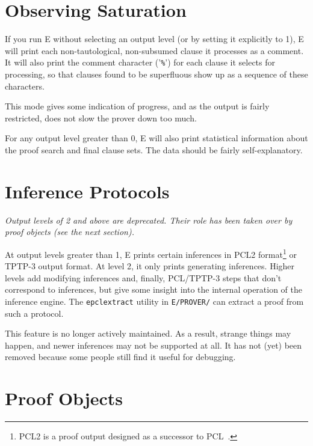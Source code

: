 \documentclass{report}
\begin{document}
\section{Observing Saturation}
\label{sec:output:normal}

If you run E without selecting an output level (or by setting it
explicitly to 1), E will print each non-tautological, non-subsumed
clause it processes as a comment. It will also print the comment
character ('\verb+%+') for each clause it selects for
processing, so that clauses found to be superfluous show up as a
sequence of these characters.

This mode gives some indication of progress, and as the output is
fairly restricted, does not slow the prover down too much.

For any output level greater than 0, E will also print statistical
information about the proof search and final clause sets. The data
should be fairly self-explanatory.


\section{Inference Protocols}
\label{sec:output:lots}

\emph{Output levels of 2 and above are deprecated. Their role has
  been taken over by proof objects (see the next section).}

At output levels greater than 1, E prints certain inferences in
PCL2 format\footnote{PCL2 is a proof output designed as a
  successor to PCL~\cite{DS94a,DS94b,DS96a}.} or TPTP-3 output
format. At level 2, it only prints generating
inferences. Higher levels add modifying inferences and, finally,
PCL/TPTP-3 steps that don't correspond to inferences, but give some
insight into the internal operation of the inference engine. The
\texttt{epclextract} utility in \texttt{E/PROVER/} can extract a
proof from such a protocol.

This feature is no longer actively maintained. As a result, strange
things may happen, and newer inferences may not be supported at
all. It has not (yet) been removed because some people still find it
useful for debugging.

\section{Proof Objects}
\label{sec:output:proofobj}
\end{document}
